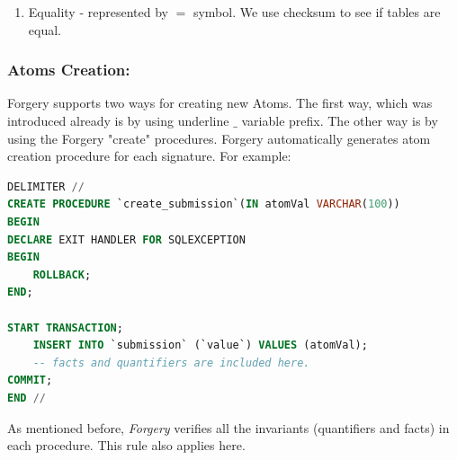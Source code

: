 \documentclass[oneside]{book}
\begin{document}
\begin{enumerate}
\item Equality - represented by $=$ symbol. We use checksum to see if tables are equal.

\end{enumerate}

\subsubsection{Atoms Creation:}

\noindent Forgery supports two ways for creating new Atoms. The first way, which was introduced already is by using underline $\_$ variable prefix. The other way is by using the Forgery "create" procedures. Forgery automatically generates atom creation procedure for each signature. For example:
\begin{lstlisting}[escapechar=@,language=SQL]
DELIMITER //
CREATE PROCEDURE `create_submission`(IN atomVal VARCHAR(100))
BEGIN
DECLARE EXIT HANDLER FOR SQLEXCEPTION
BEGIN
	ROLLBACK;
END;

START TRANSACTION;
	INSERT INTO `submission` (`value`) VALUES (atomVal);
	-- facts and quantifiers are included here.
COMMIT;
END //
\end{lstlisting}

\noindent As mentioned before, \textit{Forgery} verifies all the invariants (quantifiers and facts) in each procedure. This rule also applies here.

\newpage
\end{document}
